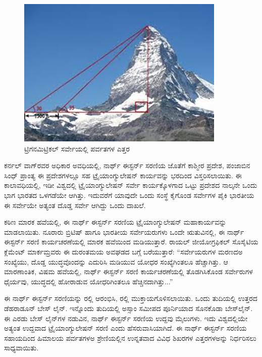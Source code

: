 \begin{figure}
\includegraphics[scale=0.6]{"images/image018.jpg"}
\caption{ಟ್ರಿಗನಮಿಟ್ರಿಕಲ್​ ಸರ್ವೇಯಲ್ಲಿ ಪರ್ವತಗಳ ಎತ್ತರ}\label{chap14-fig1}
\end{figure}

ಕರ್ನಲ್​ ವಾಗ್​ರವರ ಅಧಿಕಾರ ಅವಧಿಯಲ್ಲಿ, ನಾರ್ಥ್ ಈಸ್ಟರ್ನ್ ಸರಣಿಯ ಜೊತೆಗೆ ಕಾಶ್ಮೀರ ಪ್ರದೇಶ, ಪಂಜಾಬಿನ ಸಿಂಧ್​ ಪ್ರಾಂತ್ಯ ಈ ಪ್ರದೇಶಗಳಲ್ಲೂ ಸಹ ಟ್ರೈಯಾಂಗ್ಯುಲೇಷನ್​ ಕಾರ್ಯವನ್ನು ಭರದಿಂದ ವಿಸ್ತರಿಸಲಾಯಿತು. ಈ ಕಾಲಾವಧಿಯಲ್ಲಿ, ಇಡೀ ವಿಶ್ವದಲ್ಲಿ ಟ್ರೈಯಾಂಗ್ಯುಲೇಷನ್​ ಸರ್ವೇ ಕಾರ್ಯಕ್ಕೊಳಗಾದ ಒಟ್ಟು ಪ್ರದೇಶದ ನಾಲ್ಕನೇ ಒಂದು ಭಾಗ ಭಾರತದ ಒಳಗಡೆಯೇ ಆಗಿತ್ತು. ಇದುವರೆಗೆ ಯಾವುದೇ ಒಂದು ಸಂಸ್ಥೆ ಕೈಗೊಂಡ ಸರ್ವೇಗಳ ಪೈಕಿ ಭಾರತೀಯ ಈ ಸರ್ವೇಯೇ ಅತ್ಯಂತ ದೊಡ್ಡ ಸರ್ವೇ ಆಗಿದ್ದು ಒಂದು ದಾಖಲೆ.

ಕಠಿಣ ಮಾರಕ ಹವೆಯಲ್ಲಿ, ಈ ನಾರ್ಥ್ ಈಸ್ಟರ್ನ್ ಸರಣಿಯ ಟ್ರೈಯಾಂಗ್ಯುಲೇಷನ್​ ಮಹಾಕಾರ್ಯವನ್ನು ಮಾಡಲಾಯಿತು. ನೂರಾರು ಬ್ರಿಟಿಷ್​ ಹಾಗೂ ಭಾರತೀಯ ಸರ್ವೇಯರುಗಳು ಒಂದೇ ಋತುವಿನಲ್ಲಿ, ಈ ನಾರ್ಥ್ ಈಸ್ಟರ್ನ್ ಸರಣಿ ಕಾರ್ಯಚರಣೆಯಲ್ಲಿ ಮಾರಕ ಹವೆಯಿಂದ ಮಡಿಯುತ್ತಾರೆ. ರಾಯಲ್​ ಜೀಯೋಗ್ರಫಿಕಲ್​ ಸೊಸೈಟಿಯ ಕ್ಲೆಮೆಂಟ್​ ಮಾರ್ಕಮ್ರವರು ಈ ದುರಂತಮಯ ಅವಘಡದ ಬಗ್ಗೆ ಬರೆಯುತ್ತಾರೆ: “ಸರ್ವೇಯರುಗಳ ಮರಣದಅ ಸಂಖ್ಯೆಯು, ದೊಡ್ಡ ಯುದ್ಧವೊಂದನ್ನು ಎದುರಿಸಿ ಮಡಿಯುವ ಯೋಧರ ಸಂಖ್ಯೆಗಿಂತಲೂ ಹೆಚ್ಚಾಗಿತ್ತು. ಆ ಮಾರಣಾಂತಿಕ, ವಿಷಮ ಹವೆಯಲ್ಲಿ, ನಾರ್ಥ್ ಈಸ್ಟರ್ನ್ ಸರಣಿ ಕಾರ್ಯಚರಣೆಯಲ್ಲಿ ತೊಡಗಿಸಿಕೊಂಡ ಸರ್ವೇರುಗಳ ಧೈರ್ಯವು, ಯುದ್ಧದಲ್ಲಿ ಹೋರಾಡುವ ಯೋಧರಿಗಿಂತಲೂ ಹೆಚ್ಚಿನದಾಗಿತ್ತು...”

ಈ ನಾರ್ಥ್ ಈಸ್ಟರ್ನ್ ಸರಣಿಯನ್ನು  ರಲ್ಲಿ ಆರಂಭಿಸಿ,  ರಲ್ಲಿ ಮುಕ್ತಾಯಗೊಳಿಸಲಾಯಿತು. ಒಂದು ತುದಿಯಲ್ಲಿ ಉತ್ತರದ ಡೆಹರಾಡೂನ್​ ಬೇಸ್​ ಲೈನ್​. ಇನ್ನೊಂದು ತುದಿಯಲ್ಲಿ ಅಸ್ಸಾಂ ಸಮೀಪದ ಪೂರ್ನಿಯಾದ ಸೊನಕೊಡಾ ಬೇಸ್​ ಲೈನ್​. ಈ ಎರಡು ಬೇಸ್​ ಲೈನ್​ಗಳ ನಡುವಿನ, ನಾರ್ಥ್ ಈಸ್ಟರ್ನ್ ಸರಣಿಯ ಉದ್ದವು  ಮೈಲುಗಳು. ಇದು ವಿಶ್ವದಲ್ಲಿಯೇ ಅತ್ಯಂತ ಉದ್ದವಾದ ಟ್ರೈಯಾಂಗ್ಯುಲೇಷನ್​ ಸರಣಿ ಎಂದು ಹೆಸರುವಾಸಿಯಾಗಿದೆ. ಈ ನಾರ್ಥ್ ಈಸ್ಟರ್ನ್ ಸರಣಿಯ ಸಹಾಯದಿಂದ ಹಿಮಾಲಯ ಪರ್ವತಗಳಅ ಶ್ರೇಣಿಯಲ್ಲಿನ ಉನ್ನತವಾದ  ವಿವಿಧ ಶಿಖರಗಳ ಎತ್ತರಗಳಅನ್ನು ನಿರ್ಧರಿಸಲು ಸಾಧ್ಯವಾಯಿತು.

